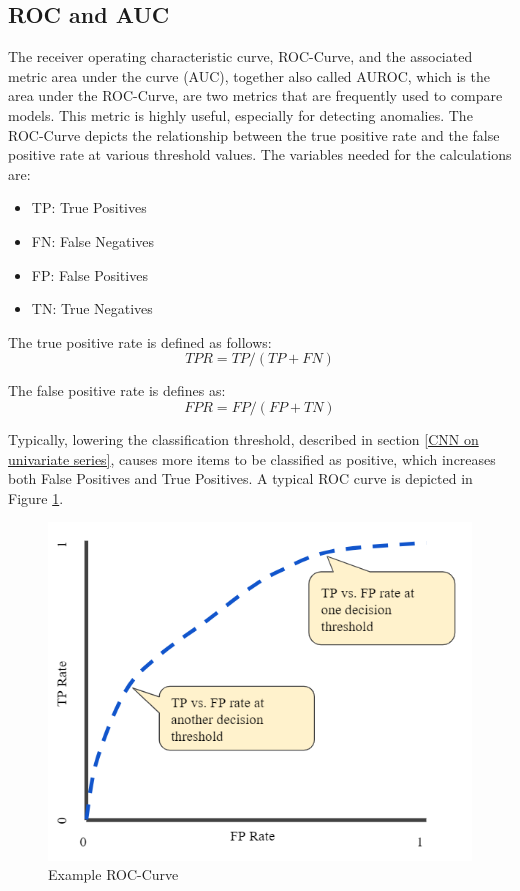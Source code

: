 \subsection{ROC and AUC} \label{AUROC}

The receiver operating characteristic curve, ROC-Curve, and the associated metric area under the curve (AUC), together also called AUROC, which is the area under the ROC-Curve, are two metrics that are frequently used to compare models. This metric is highly useful, especially for detecting anomalies. The ROC-Curve depicts the relationship between the true positive rate and the false positive rate at various threshold values. The variables needed for the calculations are:

\begin{itemize}
	\item TP: True Positives
	\item FN: False Negatives
	\item FP: False Positives
	\item TN: True Negatives	 
\end{itemize}

	
	The true positive rate is defined as follows: \[TPR = TP/(TP+FN)\]
	
	The false positive rate is defines as: \[FPR = FP/(FP+TN)\]

Typically, lowering the classification threshold, described in section \ref{CNN on univariate series}, causes more items to be classified as positive, which increases both False Positives and True Positives. A typical ROC curve is depicted in Figure \ref{fig:ROC}.

\begin{figure}[h]
	\centering
	\includegraphics[scale=00.4]{Figures/ROC}
	\decoRule
	\caption[Example ROC-Curve]{Example ROC-Curve \parencite{Google2021}}
	\label{fig:ROC}
\end{figure}

